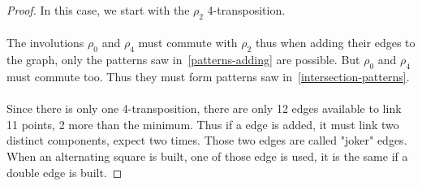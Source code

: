 \begin{proof}
  In this case, we start with the $\rho_2$ 4-transposition.

  \begin{figure}[H]
    \begin{center}
      \caption{}
    \end{center}
  \end{figure}

\paragraph{}
The involutions $\rho_0$ and $\rho_4$ must commute with $\rho_2$ thus when adding their edges to the graph, only the patterns saw in~\ref{patterns-adding} are possible. But $\rho_0$ and $\rho_4$ must commute too. Thus they must form patterns saw in~\ref{intersection-patterns}.

\paragraph{}
Since there is only one 4-transposition, there are only 12 edges available to link 11 points, 2 more than the minimum. Thus if a edge is added, it must link two distinct components, expect two times. Those two edges are called "joker" edges. When an alternating square is built, one of those edge is used, it is the same if a double edge is built.


\end{proof}
